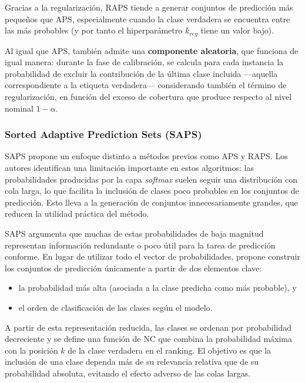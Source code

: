 Gracias a la regularización, \acrshort{RAPS} tiende a generar conjuntos de predicción más pequeños que \acrshort{APS}, especialmente cuando la clase verdadera se encuentra entre las más probables (y por tanto el hiperparámetro $k_{reg}$ tiene un valor bajo).

Al igual que \acrshort{APS}, también admite una \textbf{componente aleatoria}, que funciona de igual manera: durante la fase de calibración, se calcula para cada instancia la probabilidad de excluir la contribución de la última clase incluida ---aquella correspondiente a la etiqueta verdadera--- considerando también el término de regularización, en función del exceso de cobertura que produce respecto al nivel nominal $1-\alpha$.


\subsubsection{Sorted Adaptive Prediction Sets (SAPS)}

\acrshort{SAPS} \cite{huang2023conformal} propone un enfoque distinto a métodos previos como \acrshort{APS} y \acrshort{RAPS}. Los autores identifican una limitación importante en estos algoritmos: las probabilidades producidas por la capa \textit{softmax} suelen seguir una distribución con cola larga, lo que facilita la inclusión de clases poco probables en los conjuntos de predicción. Esto lleva a la generación de conjuntos innecesariamente grandes, que reducen la utilidad práctica del método.

\acrshort{SAPS} argumenta que muchas de estas probabilidades de baja magnitud representan información redundante o poco útil para la tarea de predicción conforme. En lugar de utilizar todo el vector de probabilidades, propone construir los conjuntos de predicción únicamente a partir de dos elementos clave: 
\begin{itemize}
    \item la probabilidad más alta (asociada a la clase predicha como más probable), y
    \item el orden de clasificación de las clases según el modelo.
\end{itemize}

A partir de esta representación reducida, las clases se ordenan por probabilidad decreciente y se define una función de \acrshort{NC} que combina la probabilidad máxima con la posición $k$ de la clase verdadera en el ranking. El objetivo es que la inclusión de una clase dependa más de su relevancia relativa que de su probabilidad absoluta, evitando el efecto adverso de las colas largas.


